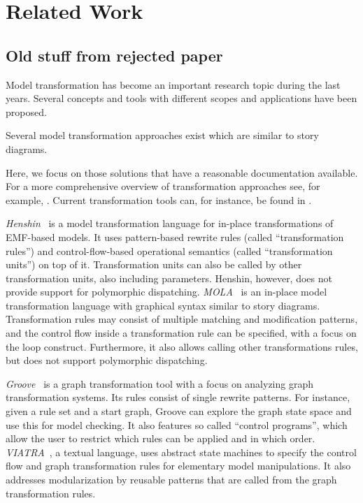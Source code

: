 \chapter{Related Work}

\section*{Old stuff from rejected paper}

Model transformation has become an important research topic during the last years.
Several concepts and tools with different scopes and applications have been proposed.

Several model transformation approaches exist which are similar to story diagrams.

Here, we focus on those solutions that have a reasonable documentation available.
For a more comprehensive overview of transformation approaches see, for example, \cite{Czarnecki06}.
Current transformation tools can, for instance, be found in \cite{TTC2010}.

\emph{Henshin}~\cite{henshin2} is a model transformation language for in-place transformations of EMF-based models.
It uses pattern-based rewrite rules (called ``transformation rules'') and control-flow-based operational semantics (called ``transformation units'') on top of it.
Transformation units can also be called by other transformation units, also including parameters.
Henshin, however, does not provide support for polymorphic dispatching.
\emph{MOLA}~\cite{mola} is an in-place model transformation language with graphical syntax similar to story diagrams.
Transformation rules may consist of multiple matching and modification patterns, and the control flow inside a transformation rule can be specified, with a focus on the loop construct.  
Furthermore, it also allows calling other transformations rules, but does not support polymorphic dispatching.

\emph{Groove}~\cite{Ren04a}  is a graph transformation tool with a focus on analyzing graph transformation systems.
Its rules consist of single rewrite patterns.
For instance, given a rule set and a start graph, Groove can explore the graph state space and use this for model checking.
It also features so called ``control programs'', which allow the user to restrict which rules can be applied and in which order.
\emph{VIATRA}~\cite{viatra}, a textual language, uses abstract state machines to specify the control flow and graph transformation rules for elementary model manipulations.
It also addresses modularization by reusable patterns that are called from the graph transformation rules. 

